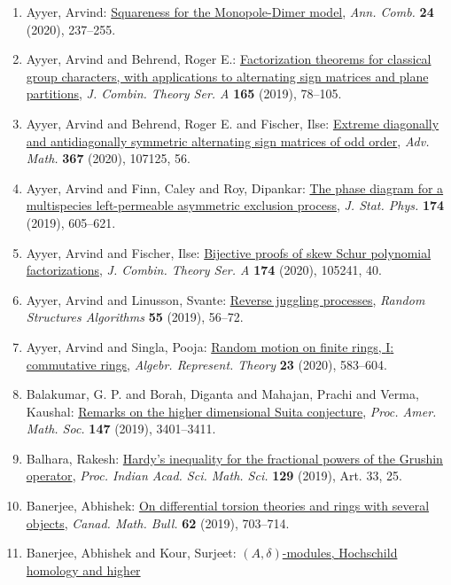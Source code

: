 \begin{enumerate}
\item Ayyer, Arvind: \href{https://doi.org/10.1007/s00026-019-00480-5}{Squareness for the {M}onopole-{D}imer model}, \emph{Ann. Comb.} {\bf 24} (2020), 237--255.
\item Ayyer, Arvind and Behrend, Roger E.: \href{https://doi.org/10.1016/j.jcta.2019.01.001}{Factorization theorems for classical group characters, with
applications to alternating sign matrices and plane
partitions}, \emph{J. Combin. Theory Ser. A} {\bf 165} (2019), 78--105.
\item Ayyer, Arvind and Behrend, Roger E. and Fischer, Ilse: \href{https://doi.org/10.1016/j.aim.2020.107125}{Extreme diagonally and antidiagonally symmetric alternating
sign matrices of odd order}, \emph{Adv. Math.} {\bf 367} (2020), 107125, 56.
\item Ayyer, Arvind and Finn, Caley and Roy, Dipankar: \href{https://doi.org/10.1007/s10955-018-2183-x}{The phase diagram for a multispecies left-permeable asymmetric
exclusion process}, \emph{J. Stat. Phys.} {\bf 174} (2019), 605--621.
\item Ayyer, Arvind and Fischer, Ilse: \href{https://doi.org/10.1016/j.jcta.2020.105241}{Bijective proofs of skew {S}chur polynomial factorizations}, \emph{J. Combin. Theory Ser. A} {\bf 174} (2020), 105241, 40.
\item Ayyer, Arvind and Linusson, Svante: \href{https://doi.org/10.1002/rsa.20825}{Reverse juggling processes}, \emph{Random Structures Algorithms} {\bf 55} (2019), 56--72.
\item Ayyer, Arvind and Singla, Pooja: \href{https://doi.org/10.1007/s10468-019-09864-w}{Random motion on finite rings, {I}: commutative rings}, \emph{Algebr. Represent. Theory} {\bf 23} (2020), 583--604.
\item Balakumar, G. P. and Borah, Diganta and Mahajan, Prachi and
Verma, Kaushal: \href{https://doi.org/10.1090/proc/14421}{Remarks on the higher dimensional {S}uita conjecture}, \emph{Proc. Amer. Math. Soc.} {\bf 147} (2019), 3401--3411.
\item Balhara, Rakesh: \href{https://doi.org/10.1007/s12044-019-0471-2}{Hardy's inequality for the fractional powers of the {G}rushin
operator}, \emph{Proc. Indian Acad. Sci. Math. Sci.} {\bf 129} (2019), Art. 33, 25.
\item Banerjee, Abhishek: \href{https://doi.org/10.4153/s0008439518000656}{On differential torsion theories and rings with several
objects}, \emph{Canad. Math. Bull.} {\bf 62} (2019), 703--714.
\item Banerjee, Abhishek and Kour, Surjeet: \href{https://doi.org/10.1007/s10231-019-00844-x}{{$(A,\delta)$}-modules, {H}ochschild homology and higher
}
\end{enumerate}
